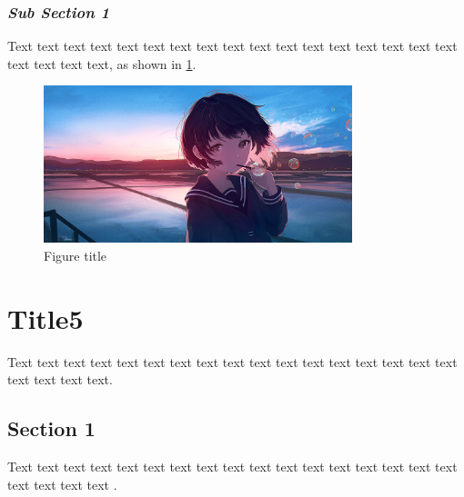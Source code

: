 \documentclass[12pt,a4paper]{article}
\numberwithin{equation}{section}
\begin{document}
{{\subsubsection{\textit{Sub Section 1}}
\hspace{2em}Text text text text text text text text text text text text text text text text text text text text text, as shown in \cref{fig:4- 1}.
\begin{figure}[h]
    \centering
    \includegraphics[width=0.8\textwidth, height=0.8\textwidth]{Fig example.png}
    \caption{Figure title}
    \label{fig:4- 1}
\end{figure}

\section{Title5}
\hspace{2em}Text text text text text text text text text text text text text text text text text text text text text.
\subsection{Section 1}
\hspace{2em}Text text text text text text text text text text text text text text text text text text text text text \cite{6}.
}}
\end{document}
